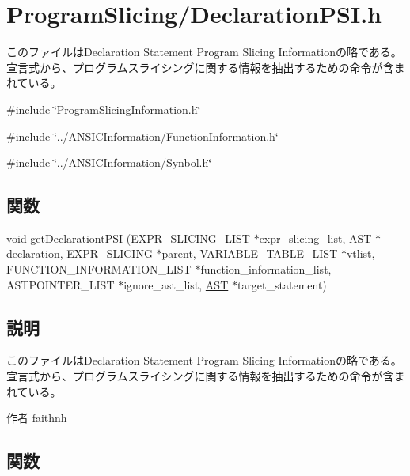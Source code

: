 \section{ProgramSlicing/DeclarationPSI.h}
\label{DeclarationPSI_8h}


このファイルはDeclaration Statement Program Slicing Informationの略である。 宣言式から、プログラムスライシングに関する情報を抽出するための命令が含まれている。  


{\ttfamily \#include \char`\"{}ProgramSlicingInformation.h\char`\"{}}\par
{\ttfamily \#include \char`\"{}../ANSICInformation/FunctionInformation.h\char`\"{}}\par
{\ttfamily \#include \char`\"{}../ANSICInformation/Synbol.h\char`\"{}}\par
\subsection*{関数}
\begin{DoxyCompactItemize}
\item 
void \hyperlink{DeclarationPSI_8h_a84e0b014b44675ec9ba51fe3ed31062f}{getDeclarationtPSI} (EXPR\_\-SLICING\_\-LIST $\ast$expr\_\-slicing\_\-list, \hyperlink{structabstract__syntax__tree}{AST} $\ast$declaration, EXPR\_\-SLICING $\ast$parent, VARIABLE\_\-TABLE\_\-LIST $\ast$vtlist, FUNCTION\_\-INFORMATION\_\-LIST $\ast$function\_\-information\_\-list, ASTPOINTER\_\-LIST $\ast$ignore\_\-ast\_\-list, \hyperlink{structabstract__syntax__tree}{AST} $\ast$target\_\-statement)
\end{DoxyCompactItemize}


\subsection{説明}
このファイルはDeclaration Statement Program Slicing Informationの略である。 宣言式から、プログラムスライシングに関する情報を抽出するための命令が含まれている。 \begin{DoxyAuthor}{作者}
faithnh 
\end{DoxyAuthor}


\subsection{関数}
